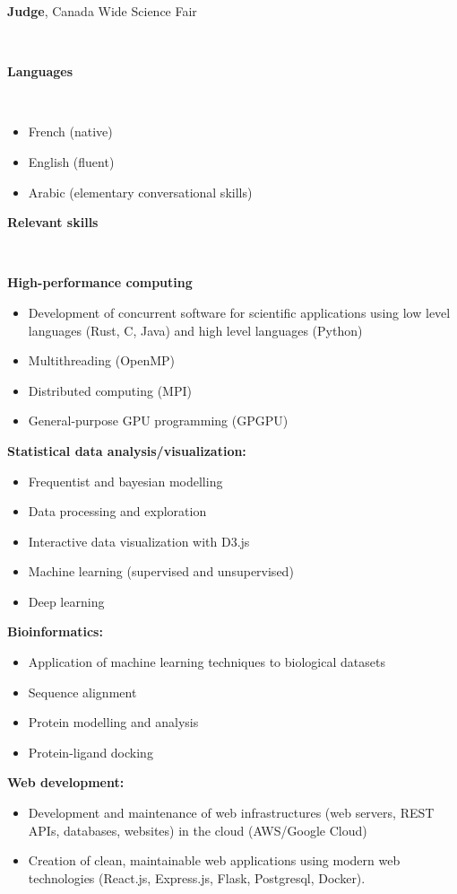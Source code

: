 \documentclass[11pt]{article}
\newcommand{\header}[1]{\begin{center}{\large \sc \bf #1}\end{center}\\}
\newcommand{\award}[5]{
	\begin{minipage}[t]{0.8\textwidth}
		{\bf #1}, {#2}\ifthenelse{\equal{#3}{}}{}{ (#3)}\\
	\ifthenelse{\equal{#5}{}}{}{#5\\}
\end{minipage}
\begin{minipage}[t]{0.2\textwidth}
	\flushright
	#4
\end{minipage}
}
\begin{document}
\award{Judge}{Canada Wide Science Fair}{}{2018}{}\\


\header{Languages}
\begin{itemize}
	\itemsep0em
  \item French (native)
  \item English (fluent)
  \item Arabic (elementary conversational skills)
\end{itemize}

\header{Relevant skills}
\nopagebreak

\textbf{High-performance computing}
\begin{itemize}
  \item Development of concurrent software for scientific applications using low level languages (Rust, C, Java) and high level languages (Python)
  \item Multithreading (OpenMP)
  \item Distributed computing (MPI)
  \item General-purpose GPU programming (GPGPU)
\end{itemize}

\textbf{Statistical data analysis/visualization:}
\begin{itemize}
  \item Frequentist and bayesian modelling
  \item Data processing and exploration
  \item Interactive data visualization with D3.js
	\item Machine learning (supervised and unsupervised)
	\item Deep learning
\end{itemize}


\textbf{Bioinformatics:}
\begin{itemize}
  \item Application of machine learning techniques to biological datasets
  \item Sequence alignment
  \item Protein modelling and analysis
	\item Protein-ligand docking
\end{itemize}


\textbf{Web development:}
\begin{itemize}
  \item Development and maintenance of web infrastructures (web servers, REST APIs, databases, websites) in the cloud (AWS/Google Cloud)
	\item Creation of clean, maintainable web applications using modern web technologies (React.js, Express.js, Flask, Postgresql, Docker).
\end{itemize}
\end{document}
